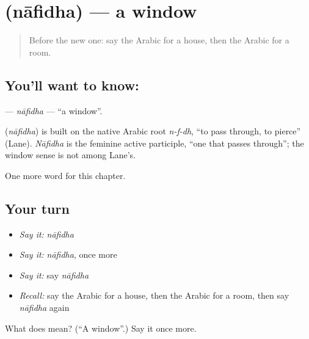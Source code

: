 \section[\texorpdfstring{\ar{نافذة} (nāfidha)}{نافذة (nāfidha)}]{ (nāfidha) — a window}

\label{lesson:AR-C69-nafidha}



\begin{quote}
Before the new one: say the Arabic for a house, then the Arabic for a room.
\end{quote}

\subsection*{You'll want to know: }
\textbf{} — \emph{nāfidha} — \textquotedblleft{}a window\textquotedblright{}.

\begin{cousinweb}
\textbf{} (\emph{nāfidha}) is built on the native Arabic root \emph{n-f-dh}, \textquotedblleft{}to pass through, to pierce\textquotedblright{} (Lane). \emph{Nāfidha} is the feminine active participle, \textquotedblleft{}one that passes through\textquotedblright{}; the window sense is not among Lane's.
\end{cousinweb}

\begin{grammarlens}[title={What you've built}]
One more word for this chapter.
\end{grammarlens}

\subsection*{Your turn}
\begin{itemize}
\raggedright
  \item \emph{Say it:} \emph{nāfidha}
  \item \emph{Say it:} \emph{nāfidha}, once more
  \item \emph{Say it:} say \emph{nāfidha}
  \item \emph{Recall:} say the Arabic for a house, then the Arabic for a room, then say \emph{nāfidha} again
\end{itemize}

\begin{tcolorbox}[breakable,colback=teal!4,colframe=teal!35!black,title={Before you move on}]
What does  mean? (\textquotedblleft{}A window\textquotedblright{}.) Say it once more.
\end{tcolorbox}
